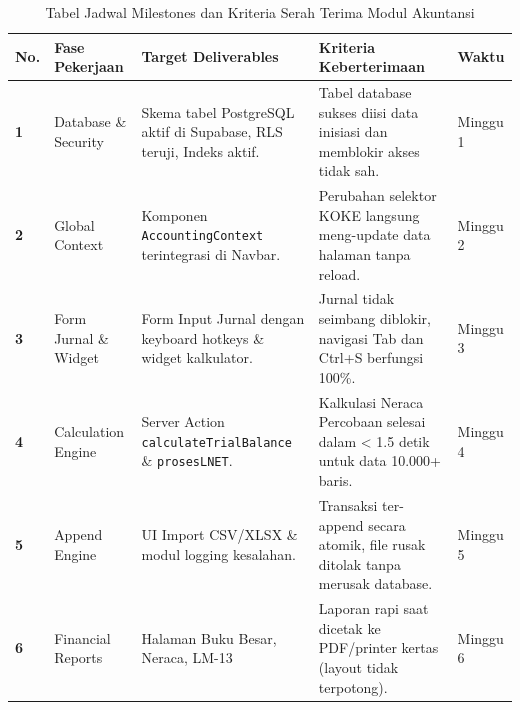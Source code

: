 \documentclass[11pt,a4paper]{article}
\begin{document}
\begin{table}[h!]
\centering
\small
\begin{tabular}{p{0.5cm} p{3.2cm} p{4.2cm} p{4.5cm} l}
    \toprule
    \textbf{No.} & \textbf{Fase Pekerjaan} & \textbf{Target Deliverables} & \textbf{Kriteria Keberterimaan} & \textbf{Waktu} \\
    \midrule
    \textbf{1} & Database \& Security & Skema tabel PostgreSQL aktif di Supabase, RLS teruji, Indeks aktif. & Tabel database sukses diisi data inisiasi dan memblokir akses tidak sah. & Minggu 1 \\
    \textbf{2} & Global Context & Komponen \texttt{AccountingContext} terintegrasi di Navbar. & Perubahan selektor KOKE langsung meng-update data halaman tanpa reload. & Minggu 2 \\
    \textbf{3} & Form Jurnal \& Widget & Form Input Jurnal dengan keyboard hotkeys \& widget kalkulator. & Jurnal tidak seimbang diblokir, navigasi Tab dan Ctrl+S berfungsi 100\%. & Minggu 3 \\
    \textbf{4} & Calculation Engine & Server Action \texttt{calculateTrialBalance} \& \texttt{prosesLNET}. & Kalkulasi Neraca Percobaan selesai dalam < 1.5 detik untuk data 10.000+ baris. & Minggu 4 \\
    \textbf{5} & Append Engine & UI Import CSV/XLSX \& modul logging kesalahan. & Transaksi ter-append secara atomik, file rusak ditolak tanpa merusak database. & Minggu 5 \\
    \textbf{6} & Financial Reports & Halaman Buku Besar, Neraca, LM-13 & Laporan rapi saat dicetak ke PDF/printer kertas (layout tidak terpotong). & Minggu 6 \\
    \bottomrule
\end{tabular}
\caption{Tabel Jadwal Milestones dan Kriteria Serah Terima Modul Akuntansi}
\end{table}

\end{document}

